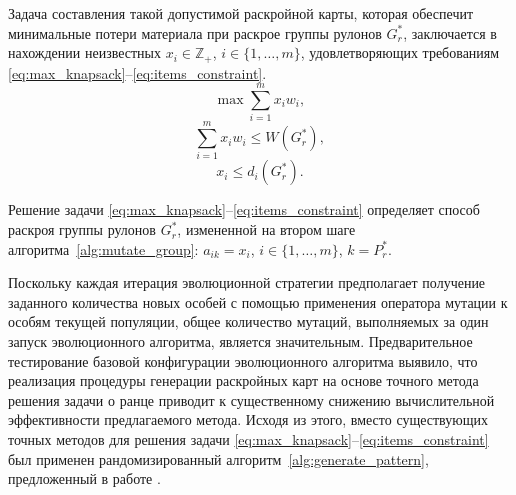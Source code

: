 \documentclass[12pt]{article}
\begin{document}
Задача составления такой допустимой раскройной карты, которая обеспечит 
минимальные потери материала при раскрое группы рулонов $G_r^*$, заключается 
в нахождении неизвестных $x_i \in \mathbb Z_+$, $i \in \{1,\ldots,m\}$, 
удовлетворяющих требованиям 
\eqref{eq:max_knapsack}--\eqref{eq:items_constraint}.    
\begin{equation}\label{eq:max_knapsack}
    \max{\sum_{i=1}^{m} x_i w_i},
\end{equation}        
\begin{equation}\label{eq:knapsack_constraint}
    \sum_{i=1}^{m} x_i w_i \leq W(G_r^*),
\end{equation}        
\begin{equation}\label{eq:items_constraint}
    x_i \leq d_i(G_r^*).
\end{equation}        

Решение задачи 
\eqref{eq:max_knapsack}--\eqref{eq:items_constraint} 
определяет способ раскроя группы рулонов $G_r^*$, 
измененной на втором шаге алгоритма~\ref{alg:mutate_group}: 
$a_{ik}=x_i$, $i \in \{1,\ldots,m\}$, $k=P_r^*$.

Поскольку каждая итерация эволюционной стратегии предполагает получение 
заданного количества новых особей с помощью применения оператора мутации к 
особям текущей популяции, общее количество мутаций, выполняемых за один запуск 
эволюционного алгоритма, является значительным. Предварительное тестирование 
базовой конфигурации эволюционного алгоритма выявило, что реализация процедуры 
генерации раскройных карт на основе точного метода решения задачи о ранце 
приводит к существенному снижению вычислительной эффективности предлагаемого 
метода. Исходя из этого, вместо существующих точных методов для решения задачи 
\eqref{eq:max_knapsack}--\eqref{eq:items_constraint} 
был применен рандомизированный алгоритм~\ref{alg:generate_pattern}, 
предложенный в работе 
\cite{vahrenkamp96}. 
\end{document}
